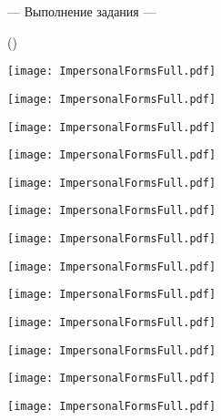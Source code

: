 \documentclass[main.tex]{subfiles}
\begin{document}


\newpage
{}

\newpage
{}

\hypertarget{ltask:2024-03-27}{--- Выполнение задания ---} (\hyperref[task:2024-03-27]{\color{blue}{перейти к тексту задания}})
\\

\newpage
{}
\label{subsec:impersonal-forms-full-view}

{\parindent25pt\texttt{[image: ImpersonalFormsFull.pdf]}}\newpage

{\parindent25pt\texttt{[image: ImpersonalFormsFull.pdf]}}\newpage

{\parindent25pt\texttt{[image: ImpersonalFormsFull.pdf]}}\newpage

{\parindent25pt\texttt{[image: ImpersonalFormsFull.pdf]}}\newpage

{\parindent25pt\texttt{[image: ImpersonalFormsFull.pdf]}}\newpage

{\parindent25pt\texttt{[image: ImpersonalFormsFull.pdf]}}\newpage

{\parindent25pt\texttt{[image: ImpersonalFormsFull.pdf]}}\newpage

{\parindent25pt\texttt{[image: ImpersonalFormsFull.pdf]}}\newpage

{\parindent25pt\texttt{[image: ImpersonalFormsFull.pdf]}}\newpage

{\parindent25pt\texttt{[image: ImpersonalFormsFull.pdf]}}\newpage

{\parindent25pt\texttt{[image: ImpersonalFormsFull.pdf]}}\newpage

{\parindent25pt\texttt{[image: ImpersonalFormsFull.pdf]}}\newpage

{\parindent25pt\texttt{[image: ImpersonalFormsFull.pdf]}}\newpage
\end{document}

